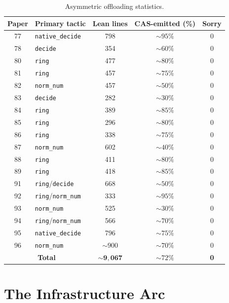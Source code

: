 \documentclass[11pt]{article}
\theoremstyle{plain}
\theoremstyle{definition}
\theoremstyle{remark}
\begin{document}
\begin{table}[ht]
\centering
\small
\caption{Asymmetric offloading statistics.}\label{tab:offloading-stats}
\begin{tabular}{@{}clccc@{}}
\toprule
Paper & Primary tactic & Lean lines & CAS-emitted (\%) & Sorry \\
\midrule
77 & \texttt{native\_decide} & 798 & ${\sim}95\%$ & 0 \\
78 & \texttt{decide} & 354 & ${\sim}60\%$ & 0 \\
80 & \texttt{ring} & 477 & ${\sim}80\%$ & 0 \\
81 & \texttt{ring} & 457 & ${\sim}75\%$ & 0 \\
82 & \texttt{norm\_num} & 457 & ${\sim}50\%$ & 0 \\
83 & \texttt{decide} & 282 & ${\sim}30\%$ & 0 \\
84 & \texttt{ring} & 389 & ${\sim}85\%$ & 0 \\
85 & \texttt{ring} & 296 & ${\sim}80\%$ & 0 \\
86 & \texttt{ring} & 338 & ${\sim}75\%$ & 0 \\
87 & \texttt{norm\_num} & 602 & ${\sim}40\%$ & 0 \\
88 & \texttt{ring} & 411 & ${\sim}80\%$ & 0 \\
89 & \texttt{ring} & 418 & ${\sim}85\%$ & 0 \\
91 & \texttt{ring}/\texttt{decide} & 668 & ${\sim}50\%$ & 0 \\
92 & \texttt{ring}/\texttt{norm\_num} & 333 & ${\sim}95\%$ & 0 \\
93 & \texttt{norm\_num} & 525 & ${\sim}30\%$ & 0 \\
94 & \texttt{ring}/\texttt{norm\_num} & 566 & ${\sim}70\%$ & 0 \\
95 & \texttt{native\_decide} & 796 & ${\sim}75\%$ & 0 \\
96 & \texttt{norm\_num} & ${\sim}900$ & ${\sim}70\%$ & 0 \\
\midrule
\multicolumn{2}{c}{\textbf{Total}} & $\mathbf{{\sim}9{,}067}$ & ${\sim}72\%$ & \textbf{0} \\
\bottomrule
\end{tabular}
\end{table}


\section{The Infrastructure Arc}\label{sec:infrastructure}
\end{document}

